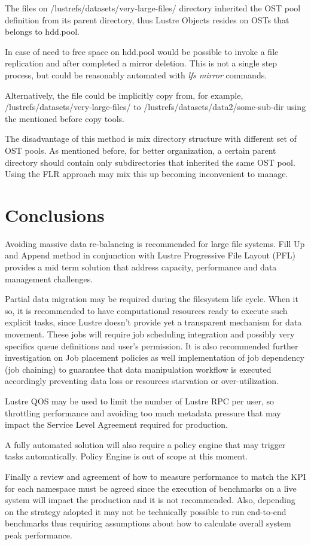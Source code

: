 \documentclass{article}
\begin{document}

The files on /lustrefs/datasets/very-large-files/ directory inherited the OST pool definition from its parent directory, thus Lustre Objects resides on OSTs that belongs to hdd.pool.

In case of need to free space on hdd.pool would be possible to invoke a file replication and after completed a mirror deletion. This is not a single step process, but could be reasonably automated with \textit{lfs mirror} commands.

Alternatively, the file could be implicitly copy from, for example, /lustrefs/datasets/very-large-files/ to /lustrefs/datasets/data2/some-sub-dir using the mentioned before copy tools. 

The disadvantage of this method is mix directory structure with different set of OST pools. As mentioned before, for better organization, a certain parent directory should contain only subdirectories that inherited the same OST pool. Using the FLR approach may mix this up becoming inconvenient to manage. 

\section{Conclusions}
Avoiding massive data re-balancing is recommended for large file systems. Fill Up and Append method in conjunction with Lustre Progressive File Layout (PFL) provides a mid term solution that address capacity, performance and data management challenges.

Partial data migration may be required during the filesystem life cycle. When it so, it is recommended to have computational resources ready to execute such explicit tasks, since Lustre doesn't provide yet a transparent mechanism for data movement. These jobs will require job scheduling integration and possibly very specifics queue definitions and user's permission. It is also recommended further investigation on Job placement policies as well implementation of job dependency (job chaining) to guarantee that data manipulation workflow is executed accordingly preventing data loss or resources starvation or over-utilization. 

Lustre QOS may be used to limit the number of Lustre RPC per user, so throttling performance and avoiding too much metadata pressure that may impact the Service Level Agreement required for production. 

A fully automated solution will also require a policy engine that may trigger tasks automatically. Policy Engine is out of scope at this moment. 

Finally a review and agreement of how to measure performance to match the KPI for each namespace must be agreed since the execution of benchmarks on a live system will impact the production and it is not recommended. Also, depending on the strategy adopted it may not be technically possible to run end-to-end benchmarks thus requiring assumptions about how to calculate overall system peak performance.
\end{document}
